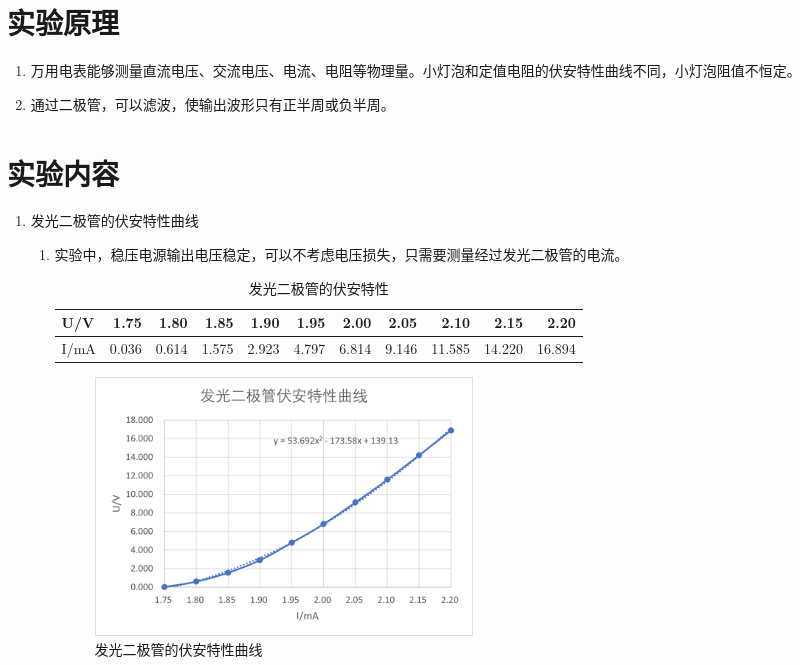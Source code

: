 \documentclass[11pt]{article}
\begin{document}
\section{实验原理}
\begin{enumerate}
    \item 万用电表能够测量直流电压、交流电压、电流、电阻等物理量。小灯泡和定值电阻的伏安特性曲线不同，小灯泡阻值不恒定。
    \item 通过二极管，可以滤波，使输出波形只有正半周或负半周。
\end{enumerate}


\section{实验内容}


\begin{enumerate}
    \item 发光二极管的伏安特性曲线
    \begin{enumerate}
        \item 实验中，稳压电源输出电压稳定，可以不考虑电压损失，只需要测量经过发光二极管的电流。
        \begin{table}[H]
            \centering
            \caption{发光二极管的伏安特性}
            \vspace*{1em}
            \begin{tabular}{|l|r|r|r|r|r|r|r|r|r|r|}\hline
            U/V   & 1.75  & 1.80  & 1.85  & 1.90  & 1.95  & 2.00  & 2.05  & 2.10  & 2.15  & 2.20  \\\hline
            I/mA  & 0.036  & 0.614  & 1.575  & 2.923  & 4.797  & 6.814  & 9.146  & 11.585  & 14.220  & 16.894  \\\hline
            \end{tabular}%
        \end{table}%
        \begin{figure}[H]
            \centering
            \includegraphics[width=10cm]{Fig/1.png}
            \caption{发光二极管的伏安特性曲线}
        \end{figure}
  

\end{enumerate}
\end{enumerate}
\end{document}
